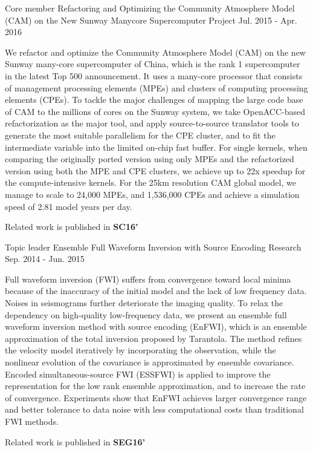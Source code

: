 \documentclass[11pt, a4paper]{awesome-cv}
\begin{document}
\begin{cventries}
  \cventry
    {Core member} %
    {Refactoring and Optimizing the Community Atmosphere Model (CAM) on the New Sunway Manycore Supercomputer} %
    {Project} %
    {Jul. 2015 - Apr. 2016} %
    {
      \begin{cvitems} %
        \item {We refactor and optimize the Community Atmosphere Model (CAM) on the new Sunway many-core supercomputer of China, which is the rank 1 supercomputer in the latest Top 500 announcement. It uses a many-core processor that consists of management processing elements (MPEs) and clusters of computing processing elements (CPEs). To tackle the major challenges of mapping the large code base of CAM to the millions of cores on the Sunway system, we take OpenACC-based refactorization as the major tool, and apply source-to-source translator tools to generate the most suitable parallelism for the CPE cluster, and to fit the intermediate variable into the limited on-chip fast buffer. For single kernels, when comparing the originally ported version using only MPEs and the refactorized version using both the MPE and CPE clusters, we achieve up to 22x speedup for the compute-intensive kernels. For the 25km resolution CAM global model, we manage to scale to 24,000 MPEs, and 1,536,000 CPEs and achieve a simulation speed of 2.81 model years per day.}
        \item {Related work is published in \textbf{SC16'}}
      \end{cvitems}
    }

  \cventry
    {Topic leader} %
    {Ensemble Full Waveform Inversion with Source Encoding} %
    {Research} %
    {Sep. 2014 - Jun. 2015} %
    {
      \begin{cvitems} %
        \item {Full waveform inversion (FWI) suffers from convergence toward local minima because of the inaccuracy of the initial model and the lack of low frequency data. Noises in seismograms further deteriorate the imaging quality. To relax the dependency on high-quality low-frequency data, we present an ensemble full waveform inversion method with source encoding (EnFWI), which is an ensemble approximation of the total inversion proposed by Tarantola. The method refines the velocity model iteratively by incorporating the observation, while the nonlinear evolution of the covariance is approximated by ensemble covariance. Encoded simultaneous-source FWI (ESSFWI) is applied to improve the representation for the low rank ensemble approximation, and to increase the rate of convergence. Experiments show that EnFWI achieves larger convergence range and better tolerance to data noise with less computational costs than traditional FWI methods.}
        \item {Related work is published in \textbf{SEG16'}}
      \end{cvitems}
    }


\end{cventries}
\end{document}
